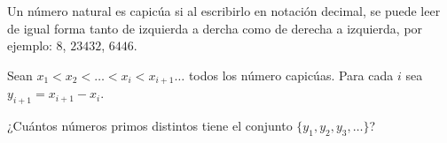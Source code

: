  Un número natural es capicúa si al escribirlo en notación decimal, se puede leer de igual forma tanto de izquierda a dercha como de derecha a izquierda, por ejemplo: $8$, $23432$, $6446$.

Sean $x_1\lt x_2\lt \dots\lt x_i\lt x_{i+1}\dots$ todos los número capicúas. Para cada $i$ sea $y_{i+1}=x_{i+1}-x_i$.

¿Cuántos números primos distintos tiene el conjunto $\{y_1,y_2,y_3,\dots \}$? 